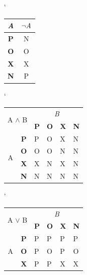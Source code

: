 \documentclass[a4paper,11pt]{article}
\begin{document}
\begin{center}
\begin{table}[htbp]
\centering
\catcode`
\begin{tabular}{|c|c|}
\hline
\emph{A}   & $\neg \emph{A}$                    \\ \hline
\bfseries{P}  & N                       \\ \hline
\bfseries{O} & O                       \\ \hline
\bfseries{X} & X                       \\ \hline
\bfseries{N} & P 			\\ \hline
\end{tabular}
\catcode`
\begin{tabular}{|c|c|l|l|l|l|}
\hline
\multicolumn{2}{|l}{\multirow{2}{*}{A $\wedge$ B}} & \multicolumn{4}{|c|}{\emph{B}}                  \\ \cline{3-6} 
\multicolumn{2}{|l|}{}                             & \textbf{P} & \textbf{O} & \textbf{X} & \textbf{N} \\ \hline
\multirow{4}{*}{A}           & \textbf{P}          & P          & O          & X          & N          \\ \cline{2-6} 
                             & \textbf{O}          & O          & O          & N          & N          \\ \cline{2-6} 
                             & \textbf{X}          & X          & N          & X          & N          \\ \cline{2-6} 
                             & \textbf{N}          & N          & N          & N          & N          \\ \hline
\end{tabular}
\catcode`
\begin{tabular}{|c|c|l|l|l|l|}
\hline
\multicolumn{2}{|l}{\multirow{2}{*}{A $\vee$ B}} & \multicolumn{4}{|c|}{\emph{B}}                  \\ \cline{3-6} 
\multicolumn{2}{|l|}{}                           & \textbf{P} & \textbf{O} & \textbf{X} & \textbf{N} \\ \hline
\multirow{4}{*}{A}          & \textbf{P}         & P          & P          & P          & P          \\ \cline{2-6} 
                            & \textbf{O}         & P          & O          & P          & O          \\ \cline{2-6} 
                            & \textbf{X}         & P          & P          & X          & X          \\ \cline{2-6} 

\end{tabular}
\end{table}
\end{center}
\end{document}

